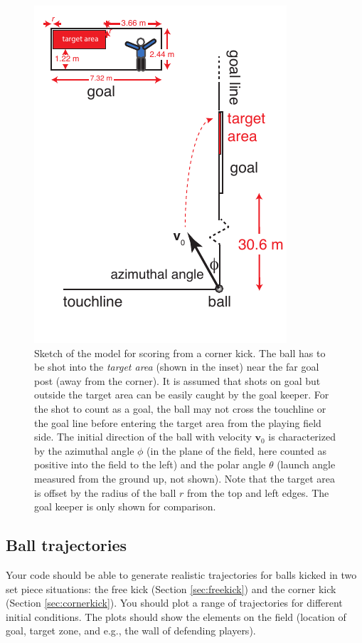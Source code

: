 \documentclass[letterpaper]{scrartcl}
\renewcommand{\vec}[1]{\ensuremath{\mathbf{#1}}}
\begin{document}
\begin{figure}
  \centering
  \includegraphics[width=0.5\linewidth]{figs/cornerkick-top.pdf}
  \caption{Sketch of the model for scoring from a corner kick. The
    ball has to be shot into the \emph{target area} (shown in the
    inset) near the far goal post (away from the corner). It is
    assumed that shots on goal but outside the target area can be
    easily caught by the goal keeper. For the shot to count as a goal,
    the ball may not cross the touchline or the goal line before
    entering the target area from the playing field side. The initial
    direction of the ball with velocity $\vec{v}_{0}$ is characterized
    by the azimuthal angle $\phi$ (in the plane of the field, here
    counted as positive into the field to the left) and the polar
    angle $\theta$ (launch angle measured from the ground up, not
    shown). Note that the target area is offset by the radius of the
    ball $r$ from the top and left edges. The goal keeper is only
    shown for comparison.}
  \label{fig:cornerkick}
\end{figure}





\subsection{Ball trajectories}
\label{sec:trajectories}

Your code should be able to generate realistic trajectories for balls
kicked in two set piece situations: the free kick (Section
\ref{sec:freekick}) and the corner kick (Section
\ref{sec:cornerkick}). You should plot a range of trajectories for
different initial conditions. The plots should show the elements on
the field (location of goal, target zone, and e.g., the wall of
defending players).
\end{document}
